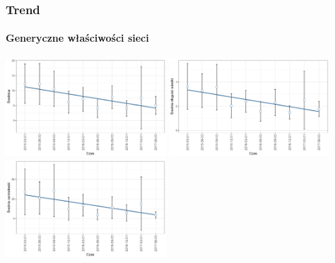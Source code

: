 \documentclass[]{beamer}
\newcommand{\sizequadsda}{0.45}
\begin{document}
\begin{frame}
 \frametitle{Trend}
 \framesubtitle{Generyczne właściwości sieci}
 
  \begin{minipage}{\textwidth}
     \centering
 			\includegraphics[width=\sizequadsda\textwidth]{pictures/srednica/srednica_sda.png}\quad  
            \includegraphics[width=\sizequadsda\textwidth]{pictures/srednia_dlugosc_sciezki/srednia_dlugosc_sciezki_sda.png}  \\
            \includegraphics[width=\sizequadsda\textwidth]{pictures/srednia_centralnosc/srednia_centralnosc_sda.png}\quad

\end{minipage}
\end{frame}
\end{document}
